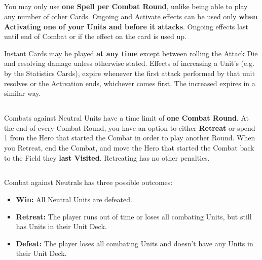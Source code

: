\begin{multicols*}{2}
\subsection*{}
You may only use \textbf{one Spell per Combat Round}, unlike being able to play any number of other Cards.
Ongoing  and  Activate effects can be used only \textbf{when Activating one of your Units and before it attacks}.
Ongoing effects last until end of Combat or if the effect on the card is used up.\par
Instant  Cards may be played \textbf{at any time} except between rolling the Attack Die and resolving damage unless otherwise stated.
Effects of increasing a Unit's  (e.g. by the Statistics Cards), expire whenever the first attack performed by that unit resolves or the Activation ends, whichever comes first.
The increased  expires in a similar way.

\subsection*{}
Combats against Neutral Units have a time limit of \textbf{one Combat Round}.
At the end of every Combat Round, you have an option to either \textbf{Retreat} or spend 1  from the Hero that started the Combat in order to play another Round.
When you Retreat, end the Combat, and move the Hero that started the Combat back to the Field they \textbf{last Visited}.
Retreating has no other penalties.


\vspace*{-1em}
\subsection*{}

Combat against Neutrals has three possible outcomes:
\begin{itemize}
  \item \textbf{Win:} All Neutral Units are defeated.
  \item \textbf{Retreat:} The player runs out of time or loses all combating Units, but still has Units in their Unit Deck.
  \item \textbf{Defeat:} The player loses all combating Units and doesn't have any Units in their Unit Deck.
\end{itemize}


\end{multicols*}

